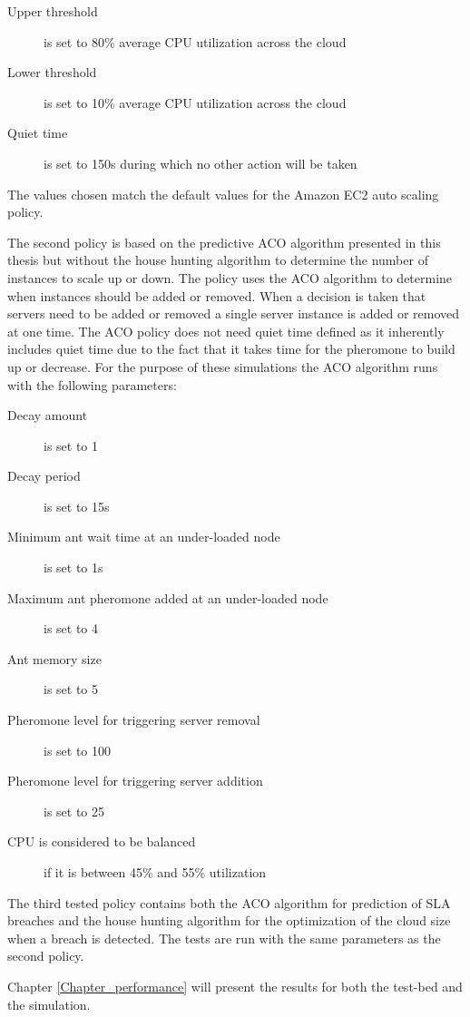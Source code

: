 \begin{description}
	\item[Upper threshold] is set to 80\% average CPU utilization across the cloud
	\item[Lower threshold] is set to 10\% average CPU utilization across the cloud
	\item[Quiet time] is set to 150s during which no other action will be taken
\end{description}

The values chosen match the default values for the Amazon EC2 auto scaling policy.

The second policy is based on the predictive ACO algorithm presented in this thesis but without the house hunting algorithm to determine the number of instances to scale up or down. The policy uses the ACO algorithm to determine when instances should be added or removed. When a decision is taken that servers need to be added or removed a single server instance is added or removed at one time. The ACO policy does not need quiet time defined as it inherently includes quiet time due to the fact that it takes time for the pheromone to build up or decrease. For the purpose of these simulations the ACO algorithm runs with the following parameters:

\begin{description}
	\item[Decay amount] is set to 1
	\item[Decay period] is set to 15s
	\item[Minimum ant wait time at an under-loaded node] is set to 1s
	\item[Maximum ant pheromone added at an under-loaded node] is set to 4
	\item[Ant memory size] is set to 5
	\item[Pheromone level for triggering server removal] is set to 100
	\item[Pheromone level for triggering server addition] is set to 25
	\item[CPU is considered to be balanced] if it is between 45\% and 55\% utilization
\end{description}

The third tested policy contains both the ACO algorithm for prediction of SLA breaches and the house hunting algorithm for the optimization of the cloud size when a breach is detected. The tests are run with the same parameters as the second policy.

Chapter \ref{Chapter_performance} will present the results for both the test-bed and the simulation.
